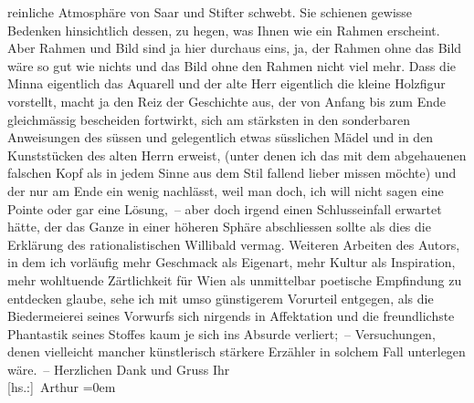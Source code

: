 \begin{ledgroupsized}[t]{13cm}
               reinliche Atmosphäre von Saar und Stifter schwebt. Sie schienen gewisse Bedenken
               hinsichtlich dessen, zu hegen, was Ihnen wie ein Rahmen erscheint. Aber Rahmen und
               Bild sind ja hier durchaus eins, ja, der Rahmen ohne das Bild wäre so gut wie nichts
               und das Bild ohne den Rahmen nicht viel mehr. Dass die Minna eigentlich das Aquarell und der alte
               Herr eigentlich die kleine Holzfigur vorstellt, macht ja den Reiz der Geschichte aus,
               der von Anfang bis zum Ende gleichmässig bescheiden fortwirkt, sich am stärksten in
               den sonderbaren Anweisungen des süssen und gelegentlich etwas süsslichen Mädel und in
               den Kunststücken des alten {\pb}Herrn erweist, (unter denen ich
               das mit dem abgehauenen falschen Kopf als in jedem Sinne aus dem Stil fallend lieber
               missen möchte) und der nur am Ende ein wenig nachlässt, weil man doch, ich will nicht
               sagen eine Pointe oder gar eine Lösung, – aber doch irgend einen Schlusseinfall
               erwartet hätte, der das Ganze in einer höheren Sphäre abschliessen sollte als dies
               die Erklärung des rationalistischen Willibald vermag. Weiteren Arbeiten des Autors, in dem ich vorläufig mehr Geschmack als Eigenart,
               mehr Kultur als Inspiration, mehr wohltuende Zärtlichkeit für Wien als unmittelbar poetische Empfindung zu entdecken glaube,
               sehe ich mit umso günstigerem Vorurteil entgegen, als die Biedermeierei seines
               Vorwurfs \introOben{}sich\introOben{} nirgends in Affektation und die freundlichste
               Phantastik seines Stoffes kaum je sich ins Absurde verliert; – Versuchungen, denen
               vielleicht mancher künstlerisch stärkere Erzähler in solchem Fall unterlegen wäre. –
               Herzlichen Dank und Gruss\pend
           \pstart
           Ihr{\\[\baselineskip]}\spacefill\mbox{{[}hs.:{]} Arthur}\pend
           \leftskip=0em{}
         
         \endnumbering{}\end{ledgroupsized}  \newcommand{\dateiname}{L02238}\newcommand{\titel}{Arthur Schnitzler an Hugo von Hofmannsthal, 22. 8. 1916}\newcommand{\editorInnen}{Martin Anton Müller und Gerd-Hermann Susen}
      